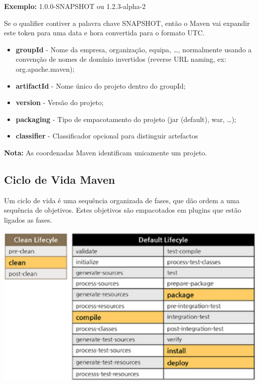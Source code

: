 \documentclass{article}
\begin{document}
\begin{flushleft}
  \textbf{Exemplo:} 1.0.0-SNAPSHOT ou 1.2.3-alpha-2
\end{flushleft}

Se o qualifier contiver a palavra chave SNAPSHOT, então o Maven
vai expandir este token para uma data e hora convertida para o formato UTC.

\vspace{2mm}

\begin{flushleft}
  \begin{itemize}
    \item \textbf{groupId} - Nome da empresa, organização, equipa, \dots,
    normalmente usando a convenção de nomes de domínio invertidos (reverse URL naming, ex: org.apache.maven);

    \item \textbf{artifactId} - Nome único do projeto dentro do groupId;
    
    \item \textbf{version} - Versão do projeto;
    \item \textbf{packaging} - Tipo de empacotamento do projeto (jar (default), war, \dots);
    \item \textbf{classifier} - Classificador opcional para distinguir artefactos
  \end{itemize}

  \vspace{2mm}

  \textbf{Nota:} As coordenadas Maven identificam unicamente um projeto.
\end{flushleft}

\subsection{Ciclo de Vida Maven}

Um ciclo de vida é uma sequência organizada de fases,
que dão ordem a uma sequência de objetivos.
Estes objetivos são empacotados em plugins que estão ligados
as fases.

\begin{center}
  \includegraphics[scale=0.5]{1}
\end{center}
\end{document}
